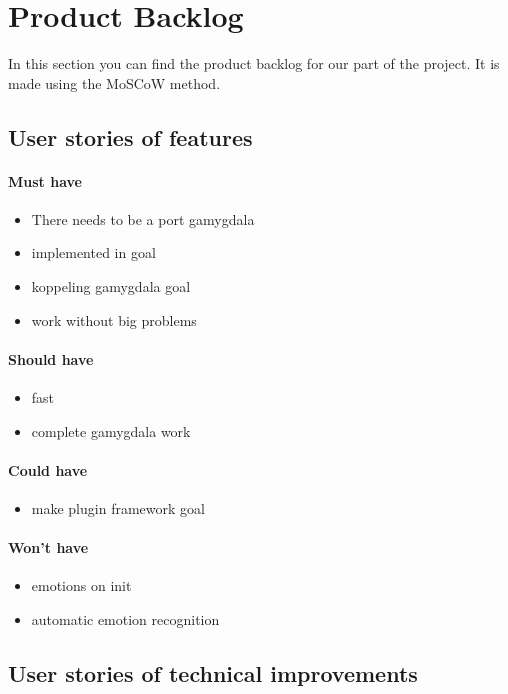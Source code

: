\section{Product Backlog}
In this section you can find the product backlog for our part of the project. It is made using the MoSCoW method.

\subsection{User stories of features}
\paragraph{Must have} 
\begin{itemize}
\item There needs to be a port gamygdala
\item implemented in goal
\item koppeling gamygdala goal
\item work without big problems
\end{itemize}

\paragraph{Should have} 
\begin{itemize}
\item fast
\item complete gamygdala work
\end{itemize}

\paragraph{Could have} 
\begin{itemize}
\item make plugin framework goal
\end{itemize}

\paragraph{Won't have} 
\begin{itemize}
\item emotions on init
\item automatic emotion recognition
\end{itemize}

\subsection{User stories of technical improvements}
